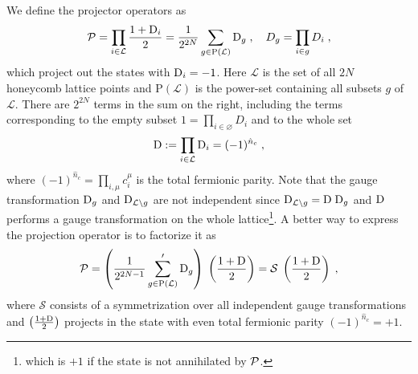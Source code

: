 We define the projector operators as
\begin{equation}
    \mathcal{P} = \prod_{i\in \mathcal{L} } \frac{1+\mathrm{D}_i}{2} = \frac{1}{2^{2N}}  \sum_{g \in \mathrm{P}(\mathcal{L})} \mathrm{D}_g \; , \quad D_g = \prod_{i\in g } D_i \; ,
\end{equation}
which project out the states with $\mathrm{D}_i=-1$.
Here $\mathcal{L}$ is the set of all $2N$ honeycomb lattice points and $\mathrm{P}(\mathcal{L})$ is the power-set containing all subsets $g$ of $\mathcal{L}$.
There are $2^{2N}$ terms in the sum on the right, including the terms corresponding to the empty subset $1= \prod_{i\in \varnothing } D_i$ and to the whole set
\begin{equation}
    \mathrm{D}:= \prod_{i\in \mathcal{L} } \mathrm{D}_i = (-1)^{\hat{n}_c}\; ,
\end{equation}
where $(-1)^{\hat{n}_c} = \prod_{i,\mu} c_i^\mu$ is the total fermionic parity. %
Note that the gauge transformation $\mathrm{D}_{g}$ and $\mathrm{D}_{\mathcal{L}\backslash g}$ are not independent since $\mathrm{D}_{\mathcal{L}\backslash g} = \mathrm{D} \; \mathrm{D}_g$ and $\mathrm{D}$ performs a gauge transformation on the whole lattice\footnote{which is $+1$ if the state is not annihilated by $\mathcal{P}$.}.
A better way to express the projection operator is to factorize it as \cite{Pedrocchi2011,Yao_2009,Yao_2010}
\begin{equation}
    \mathcal{P} =  \left(
    \frac{1}{2^{2N-1}}  \sum_{g \in \mathrm{P}(\mathcal{L})}^\prime  \mathrm{D}_g
    \right) \; \left( \frac{1+\mathrm{D}}{2} \right)
    = \mathcal{S} \;   \left( \frac{1+\mathrm{D}}{2} \right)
    \; ,
\end{equation}
where $\mathcal{S}$ consists of a symmetrization over all independent gauge transformations and $ \left( \frac{1+\mathrm{D}}{2} \right) $ projects in the state with even total fermionic parity $(-1)^{\hat{n}_c}=+1$.

